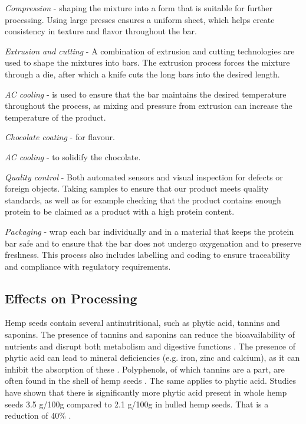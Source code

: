 \vspace{1em}
\textit{Compression} - shaping the mixture into a form that is suitable for further processing. Using large presses ensures a uniform sheet, which helps create consistency in texture and flavor throughout the bar.

\vspace{1em}
\textit{Extrusion and cutting} - A combination of extrusion and cutting technologies are used to shape the mixtures into bars. The extrusion process forces the mixture through a die, after which a knife cuts the long bars into the desired length.

\vspace{1em}
\textit{AC cooling} - is used to ensure that the bar maintains the desired temperature throughout the process, as mixing and pressure from extrusion can increase the temperature of the product.

\vspace{1em}
\textit{Chocolate coating} - for flavour.

\vspace{1em}
\textit{AC cooling} - to solidify the chocolate.

\vspace{1em}
\textit{Quality control} - Both automated sensors and visual inspection for defects or foreign objects. Taking samples to ensure that our product meets quality standards, as well as for example checking that the product contains enough protein to be claimed as a product with a high protein content. 

\vspace{1em}
\textit{Packaging} - wrap each bar individually and in a material that keeps the protein bar safe and to ensure that the bar does not undergo oxygenation and to preserve freshness. This process also includes labelling and coding to ensure traceability and compliance with regulatory requirements.

\subsection{Effects on Processing}
Hemp seeds contain several antinutritional, such as phytic acid, tannins and saponins. The presence of tannins and saponins can reduce the bioavailability of nutrients and disrupt both metabolism and digestive functions \cite*{HempBook}. The presence of phytic acid can lead to mineral deficiencies (e.g. iron, zinc and calcium), as it can inhibit the absorption of these \cite*{HempBook}.  Polyphenols, of which tannins are a part, are often found in the shell of hemp seeds \cite*{montero2023hemp}. The same applies to phytic acid. Studies have shown that there is significantly more phytic acid present in whole hemp seeds 3.5 g/100g compared to 2.1 g/100g in hulled hemp seeds. That is a reduction of 40\% \cite*{HempBook}.

